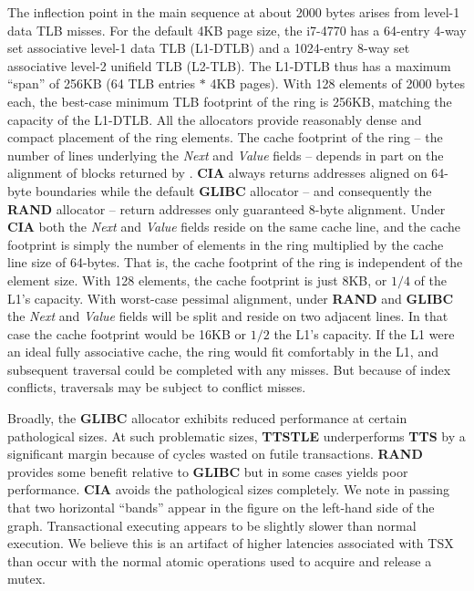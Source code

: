\documentclass[preprint]{sigplanconf}
\begin{document}
The inflection point in the main sequence at about 2000 bytes arises from level-1 data
TLB misses.  For the default 4KB page size, the i7-4770 has a 64-entry 4-way set associative
level-1 data TLB (L1-DTLB) and a 1024-entry 8-way set associative level-2 
unifield TLB (L2-TLB).  
The L1-DTLB thus has a maximum ``span'' of 256KB (64 TLB entries $*$ 4KB pages).  
With 128 elements of 2000 bytes each, the best-case minimum TLB footprint of 
the ring is 256KB, matching the capacity of the L1-DTLB.  
All the allocators provide reasonably dense and compact placement of the ring elements.  
The cache footprint of the ring -- the number of lines underlying the \emph{Next}
and \emph{Value} fields -- depends in part on the alignment of blocks returned
by \malloc{}.  \textbf{CIA} always returns addresses aligned on 64-byte boundaries
while the default \textbf{GLIBC} allocator -- and consequently the \textbf{RAND} 
allocator -- return addresses only guaranteed 8-byte alignment.  Under \textbf{CIA}
both the \emph{Next} and \emph{Value} fields reside on the same cache 
line, and the cache footprint is simply the number of elements in the ring multiplied
by the cache line size of 64-bytes.  That is, the cache footprint of  
the ring is independent of the element size.  With 128 elements, the cache 
footprint is just 8KB, or $1/4$ of
the L1's capacity.  With worst-case pessimal alignment, under \textbf{RAND} and
\textbf{GLIBC} the \emph{Next} and \emph{Value} fields will be split and reside
on two adjacent lines.   In that case the cache footprint would be 16KB or $1/2$
the L1's capacity.  If the L1 were an ideal fully associative cache, the ring would
fit comfortably in the L1, and subsequent traversal could be completed with any misses.
But because of index conflicts, traversals may be subject to conflict misses. 

Broadly, the \textbf{GLIBC} allocator exhibits reduced performance at 
certain pathological sizes.   At such problematic sizes, \textbf{TTSTLE} underperforms
\textbf{TTS} by a significant margin because of cycles wasted on futile
transactions.  \textbf{RAND} provides some benefit relative to \textbf{GLIBC}
but in some cases yields poor performance.  \textbf{CIA} avoids the pathological
sizes completely.   We note in passing that two horizontal ``bands'' appear 
in the figure on the left-hand side of the graph.  Transactional executing appears
to be slightly slower than normal execution.   We believe this is an artifact
of higher latencies associated with TSX than occur with the normal atomic
operations used to acquire and release a mutex. 
\end{document}
